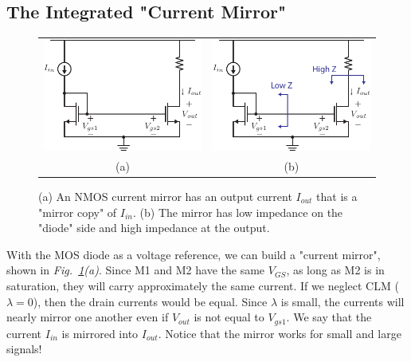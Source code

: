 \subsection{The Integrated "Current Mirror"}
\begin{figure}[tb]
\centering
\begin{tabular}{cc}
\includegraphics[scale=1]{5mirror_105.pdf} &
\includegraphics[scale=1]{5bmirror_105.pdf}\\
(a) & (b)\\
\end{tabular}
\caption{(a) An NMOS current mirror has an output current $I_{out}$ that is a "mirror copy" of $I_{in}$.  (b) The mirror has low impedance on the "diode" side and high impedance at the output.} \label{fig:5mirror_105.pdf}
\end{figure}
With the MOS diode as a voltage reference, we can build a "current mirror", shown in \emph{Fig.~\ref{fig:5mirror_105.pdf}(a)}.  Since M1 and M2 have the same $V_{GS}$, as long as M2 is in saturation, they will carry approximately the same current.  If we neglect CLM ($\lambda = 0$), then the drain currents would be equal. Since $\lambda$ is small, the currents will nearly mirror one another even if $V_{out}$ is not equal to $V_{gs1}$. We say that the current $I_{in}$ is mirrored into $I_{out}$. Notice that the mirror works for small and large signals!
